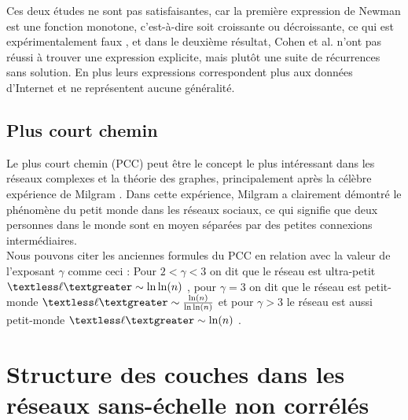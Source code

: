 Ces deux études ne sont pas satisfaisantes, car la première expression de Newman est une fonction monotone, c'est-à-dire soit croissante ou décroissante, ce qui est expérimentalement faux \cite{Cohen-Havlinl2010}, et dans le deuxième résultat, Cohen et al.  n'ont pas réussi à trouver une expression explicite, mais plutôt une suite de récurrences sans solution. En plus leurs expressions correspondent plus aux données d'Internet et ne représentent aucune généralité.
 
\subsection{Plus court chemin}
\label{PCC}
 Le plus court chemin (PCC) peut être le concept le plus intéressant dans les réseaux complexes et la théorie des graphes, principalement après la célèbre expérience de Milgram \cite{Mi1967}. Dans cette expérience, Milgram a clairement démontré le phénomène du petit monde dans les réseaux sociaux, ce qui signifie que deux personnes dans le monde sont en moyen séparées par des petites connexions intermédiaires.\\
 Nous pouvons citer les anciennes formules du PCC  en relation avec la valeur de l'exposant $\gamma$ comme ceci : Pour $2<\gamma<3$ on dit que le réseau est ultra-petit $\textless\ell\textgreater\sim \ln\ln(n)$ \cite{Cohen-Havlin2003,Do-al2003,Cohen-al2002,Chung-Lu2002,Fox-Bellwood2014,Hofstad-al2014}, pour $\gamma=3$ on dit que le réseau est petit-monde $\textless\ell\textgreater\sim\frac{\ln(n)}{\ln\ln(n)}$ \cite{Bollobas1985,Chung-Lu2002,Fronczak-al2004,Hofstad-al2004,Cohen-Havlin2009} et pour $\gamma>3$ le réseau est aussi petit-monde $\textless\ell\textgreater\sim\ln(n)$ \cite{Bollobas1985,Chung-Lu2002,Fronczak-al2004,Hofstad-al2004,Cohen-Havlin2009}.  

\section{Structure des couches dans les réseaux sans-échelle non corrélés}
